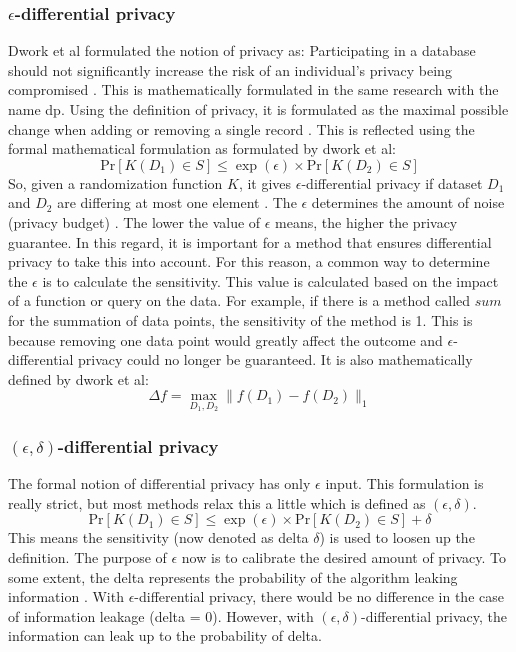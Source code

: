 \subsubsection{$\epsilon$-differential privacy}
Dwork et al formulated the notion of privacy as: Participating in a database should not significantly increase the risk of an individual's privacy being compromised \cite{dwork_differential_2006}.
This is mathematically formulated in the same research with the name \gls{dp}.
Using the definition of privacy, it is formulated as the maximal possible change when adding or removing a single record \citep{dwork_differential_2006, friedman_data_2010}.
This is reflected using the formal mathematical formulation as formulated by dwork et al:
\begin{equation}
  {\mathrm{Pr}}[K(D_{1})\in S]\leq\exp(\epsilon)\times{\mathrm{Pr}}[K(D_{2})\in S]
  \label{pure-dp}
\end{equation}
So, given a randomization function $K$, it gives $\epsilon$-differential privacy if dataset $D_1$ and $D_2$ are differing at most one element \citep{dwork_differential_2006}.
The $\epsilon$ determines the amount of noise (privacy budget) \citep{friedman_data_2010}.
The lower the value of $\epsilon$ means, the higher the privacy guarantee.
In this regard, it is important for a method that ensures differential privacy to take this into account.
For this reason, a common way to determine the $\epsilon$ is to calculate the sensitivity.
This value is calculated based on the impact of a function or query on the data.
For example, if there is a method called $sum$ for the summation of data points, the sensitivity of the method is 1.
This is because removing one data point would greatly affect the outcome and $\epsilon$-differential privacy could no longer be guaranteed.
It is also mathematically defined by dwork et al:
\begin{equation}
  \Delta f=\operatorname*{max}_{D_{1},D_{2}}\|f(D_{1})-f(D_{2})\|_{1}
  \label{sensitivity-dp}
\end{equation}
\subsubsection{$(\epsilon, \delta)$-differential privacy}
The formal notion of differential privacy has only $\epsilon$ input.
This formulation is really strict, but most methods relax this a little which is defined as $(\epsilon, \delta)$.
\begin{equation}
  {\mathrm{Pr}}[K(D_{1})\in S]\leq\exp(\epsilon)\times{\mathrm{Pr}}[K(D_{2})\in S] + \delta
  \label{approxiate-dp}
\end{equation}
This means the sensitivity (now denoted as delta $\delta$) is used to loosen up the definition.
The purpose of $\epsilon$ now is to calibrate the desired amount of privacy.
To some extent, the delta represents the probability of the algorithm leaking information \citep{aitsam_differential_2021}.
With $\epsilon$-differential privacy, there would be no difference in the case of information leakage (delta = 0).
However, with $(\epsilon, \delta)$-differential privacy, the information can leak up to the probability of delta.
\newpage
